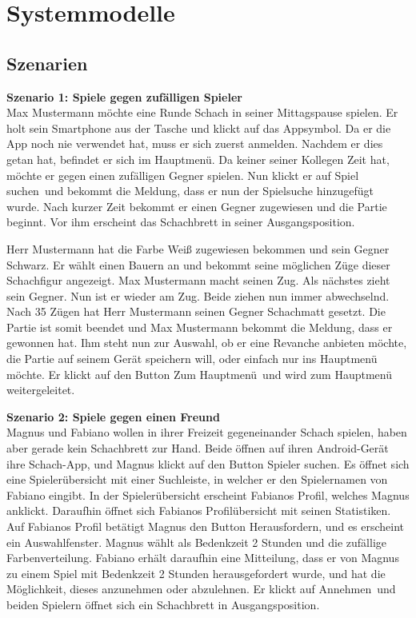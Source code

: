 \documentclass[parskip=full]{scrartcl}
\begin{document}
	
	
	\pagebreak
	\section{Systemmodelle}
	\subsection{Szenarien}
	\textbf{Szenario 1: \glqq Spiele gegen zufälligen Spieler\grqq} \\
	Max Mustermann möchte eine Runde \gls{Schach} in seiner Mittagspause spielen. Er holt sein \gls{Smartphone} aus der Tasche und klickt auf das Appsymbol.
	Da er die App noch nie verwendet hat, muss er sich zuerst anmelden. Nachdem er dies getan hat, befindet er sich im Hauptmenü.
	Da keiner seiner Kollegen Zeit hat, möchte er gegen einen zufälligen Gegner spielen. Nun klickt er auf \glqq Spiel suchen\grqq\ und bekommt die Meldung, dass er nun der Spielsuche hinzugefügt wurde.
	Nach kurzer Zeit bekommt er einen Gegner zugewiesen und die Partie beginnt. Vor ihm erscheint das \gls{Schachbrett} in seiner \gls{Ausgangsposition}.
	
	Herr Mustermann hat die Farbe Weiß zugewiesen bekommen und sein Gegner Schwarz. Er wählt einen Bauern an und bekommt seine möglichen Züge dieser \gls{Schachfigur} angezeigt.
	Max Mustermann macht seinen Zug. Als nächstes zieht sein Gegner. Nun ist er wieder am Zug. Beide ziehen nun immer abwechselnd. Nach 35 Zügen hat Herr Mustermann
	seinen Gegner \gls{Schachmatt} gesetzt. Die Partie ist somit beendet und Max Mustermann bekommt die Meldung, dass er gewonnen hat. Ihm steht nun zur Auswahl, ob er eine Revanche anbieten möchte, die Partie auf seinem Gerät speichern will, oder einfach nur ins Hauptmenü möchte. Er klickt auf den Button \glqq Zum Hauptmenü\grqq\ und wird zum Hauptmenü weitergeleitet.
	
	\textbf{Szenario 2: \glqq Spiele gegen einen Freund\grqq} \\
	Magnus und Fabiano wollen in ihrer Freizeit gegeneinander Schach spielen, haben aber gerade kein Schachbrett zur Hand. Beide öffnen auf ihren \gls{Android}-Gerät ihre Schach-App, und Magnus klickt auf den Button \glqq Spieler suchen\grqq. Es öffnet sich eine Spielerübersicht mit einer Suchleiste, in welcher er den Spielernamen von Fabiano eingibt. In der Spielerübersicht erscheint Fabianos Profil, welches Magnus anklickt. Daraufhin öffnet sich Fabianos Profilübersicht mit seinen Statistiken. Auf Fabianos Profil betätigt Magnus den Button \glqq Herausfordern\grqq, und es erscheint ein Auswahlfenster. Magnus wählt als \gls{Bedenkzeit} 2 Stunden und die zufällige Farbenverteilung. Fabiano erhält daraufhin eine Mitteilung, dass er von Magnus zu einem Spiel mit \gls{Bedenkzeit} 2 Stunden herausgefordert wurde, und hat die Möglichkeit, dieses anzunehmen oder abzulehnen. Er klickt auf \glqq Annehmen\grqq\ und beiden Spielern öffnet sich ein \gls{Schachbrett} in \gls{Ausgangsposition}.
	
\end{document}
